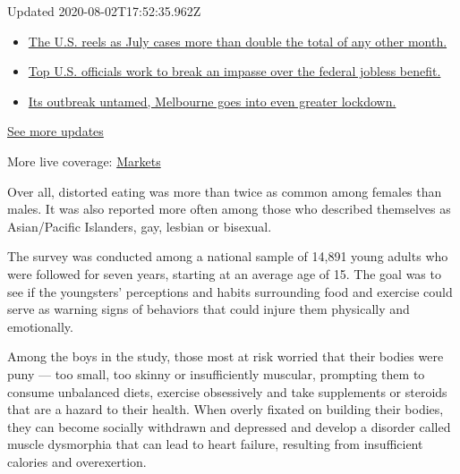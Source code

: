 Updated 2020-08-02T17:52:35.962Z

\begin{itemize}
\tightlist
\item
  \href{https://www.nytimes3xbfgragh.onion/2020/08/01/world/coronavirus-covid-19.html?action=click\&pgtype=Article\&state=default\&region=MAIN_CONTENT_1\&context=storylines_live_updates\#link-34047410}{The
  U.S. reels as July cases more than double the total of any other
  month.}
\item
  \href{https://www.nytimes3xbfgragh.onion/2020/08/01/world/coronavirus-covid-19.html?action=click\&pgtype=Article\&state=default\&region=MAIN_CONTENT_1\&context=storylines_live_updates\#link-780ec966}{Top
  U.S. officials work to break an impasse over the federal jobless
  benefit.}
\item
  \href{https://www.nytimes3xbfgragh.onion/2020/08/01/world/coronavirus-covid-19.html?action=click\&pgtype=Article\&state=default\&region=MAIN_CONTENT_1\&context=storylines_live_updates\#link-2bc8948}{Its
  outbreak untamed, Melbourne goes into even greater lockdown.}
\end{itemize}

\href{https://www.nytimes3xbfgragh.onion/2020/08/01/world/coronavirus-covid-19.html?action=click\&pgtype=Article\&state=default\&region=MAIN_CONTENT_1\&context=storylines_live_updates}{See
more updates}

More live coverage:
\href{https://www.nytimes3xbfgragh.onion/live/2020/07/31/business/stock-market-today-coronavirus?action=click\&pgtype=Article\&state=default\&region=MAIN_CONTENT_1\&context=storylines_live_updates}{Markets}

Over all, distorted eating was more than twice as common among females
than males. It was also reported more often among those who described
themselves as Asian/Pacific Islanders, gay, lesbian or bisexual.

The survey was conducted among a national sample of 14,891 young adults
who were followed for seven years, starting at an average age of 15. The
goal was to see if the youngsters' perceptions and habits surrounding
food and exercise could serve as warning signs of behaviors that could
injure them physically and emotionally.

Among the boys in the study, those most at risk worried that their
bodies were puny --- too small, too skinny or insufficiently muscular,
prompting them to consume unbalanced diets, exercise obsessively and
take supplements or steroids that are a hazard to their health. When
overly fixated on building their bodies, they can become socially
withdrawn and depressed and develop a disorder called muscle dysmorphia
that can lead to heart failure, resulting from insufficient calories and
overexertion.

